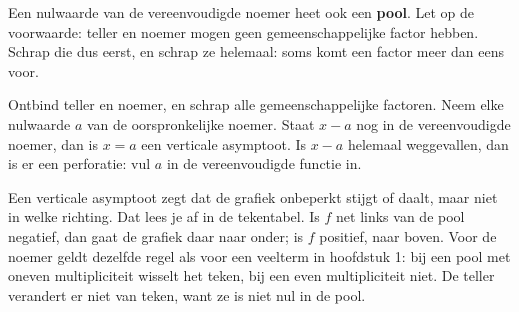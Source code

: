 Een nulwaarde van de vereenvoudigde noemer heet ook een \textbf{pool}. Let op de voorwaarde: teller en noemer mogen geen gemeenschappelijke factor hebben. Schrap die dus eerst, en schrap ze helemaal: soms komt een factor meer dan eens voor.


\begin{werkwijze}
Ontbind teller en noemer, en schrap alle gemeenschappelijke factoren. Neem elke nulwaarde $a$ van de oorspronkelijke noemer. Staat $x - a$ nog in de vereenvoudigde noemer, dan is $x = a$ een verticale asymptoot. Is $x - a$ helemaal weggevallen, dan is er een perforatie: vul $a$ in de vereenvoudigde functie in.
\end{werkwijze}

\begin{oefeningen}
\end{oefeningen}

Een verticale asymptoot zegt dat de grafiek onbeperkt stijgt of daalt, maar niet in welke richting. Dat lees je af in de tekentabel. Is $f$ net links van de pool negatief, dan gaat de grafiek daar naar onder; is $f$ positief, naar boven. Voor de noemer geldt dezelfde regel als voor een veelterm in hoofdstuk 1: bij een pool met oneven multipliciteit wisselt het teken, bij een even multipliciteit niet. De teller verandert er niet van teken, want ze is niet nul in de pool.

